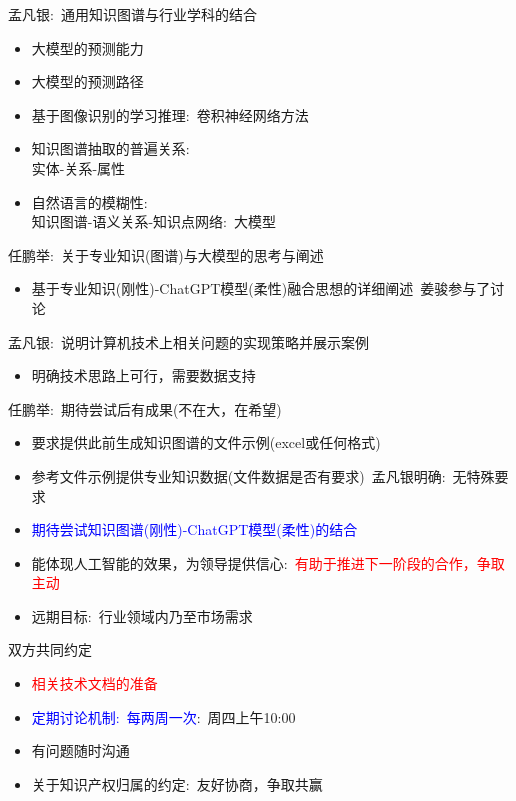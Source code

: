 {孟凡银}:~通用知识图谱与行业学科的结合
\begin{itemize}
	\item 大模型的预测能力
	\item 大模型的预测路径
	\item 基于图像识别的学习推理:~卷积神经网络方法
	\item 知识图谱抽取的普遍关系:\\
		实体-关系-属性
	\item 自然语言的模糊性:\\
		知识图谱-语义关系-知识点网络:~大模型
\end{itemize}

{任鹏举}:~关于专业知识(图谱)与大模型的思考与阐述
\begin{itemize}
	\item 基于专业知识(刚性)-\textrm{ChatGPT}模型(柔性)融合思想的详细阐述~姜骏参与了讨论
\end{itemize}

{孟凡银}:~说明计算机技术上相关问题的实现策略并展示案例
\begin{itemize}
	\item 明确技术思路上可行，需要数据支持
\end{itemize}

		
{任鹏举}:~期待尝试后有成果(不在大，在希望)
\begin{itemize}
	\item 要求提供此前生成知识图谱的文件示例(\textrm{excel}或任何格式)
	\item 参考文件示例提供专业知识数据(文件数据是否有要求)~孟凡银明确:~无特殊要求
	\item \textcolor{blue}{期待尝试知识图谱(刚性)-\textrm{ChatGPT}模型(柔性)的结合}
	\item 能体现人工智能的效果，为领导提供信心:~\textcolor{red}{有助于推进下一阶段的合作，争取主动}
	\item 远期目标:~行业领域内乃至市场需求
\end{itemize}

{双方共同约定}
\begin{itemize}
	\item \textcolor{red}{相关技术文档的准备}
	\item \textcolor{blue}{定期讨论机制:~每两周一次}:~周四上午\textrm{10:00}
	\item 有问题随时沟通
	\item 关于知识产权归属的约定:~友好协商，争取共赢
\end{itemize}

